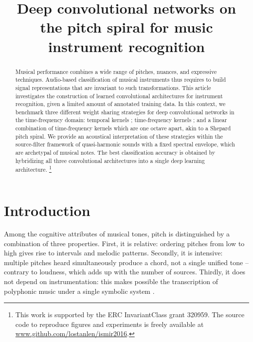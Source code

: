\documentclass{article}
\title{Deep convolutional networks on the pitch spiral for music instrument recognition}
\newcommand\blfootnote[1]{%
  \begingroup
  \renewcommand\thefootnote{}\footnote{#1}%
  \addtocounter{footnote}{-1}%
  \endgroup
}
\begin{document}
%
\maketitle
%
\begin{abstract}
Musical performance combines a wide range of pitches, nuances,
and expressive techniques.
Audio-based classification of musical instruments thus requires to
build signal representations that are invariant to such transformations.
This article investigates the construction
of learned convolutional architectures for instrument recognition,
given a limited amount of annotated training data.
In this context, we benchmark three different weight sharing
strategies for deep convolutional networks in the
time-frequency domain: temporal kernels ;
time-frequency kernels ;
and a linear combination of time-frequency
kernels which are one octave apart, akin to a Shepard pitch spiral.
We provide an acoustical interpretation of these strategies
within the source-filter framework of quasi-harmonic sounds with
a fixed spectral envelope, which are archetypal of musical notes.
The best classification accuracy is obtained by hybridizing all three
convolutional architectures into a single deep learning architecture.
\blfootnote{This work is supported by the ERC InvariantClass grant 320959.
The source code to reproduce figures and experiments is freely available at
\url{www.github.com/lostanlen/ismir2016}.}

\end{abstract}

\section{Introduction}\label{sec:introduction}
Among the cognitive attributes of musical tones, pitch is distinguished
by a combination of three properties.
First, it is relative: ordering pitches from low to high gives rise to
intervals and melodic patterns.
Secondly, it is intensive: multiple pitches heard simultaneously produce
a chord, not a single unified tone -- contrary to loudness, which adds
up with the number of sources.
Thirdly, it does not depend on instrumentation: this makes possible
the transcription of polyphonic music under a single symbolic system
\cite{deCheveigne2005}.
\end{document}
